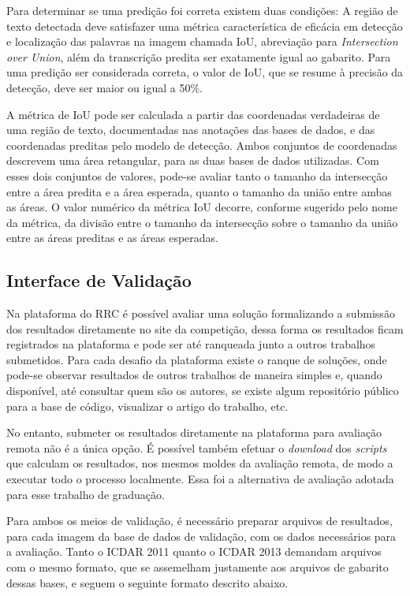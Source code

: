 Para determinar se uma predição foi correta existem duas condições: A região de texto detectada deve satisfazer uma métrica característica de 
eficácia em detecção e localização das palavras na imagem chamada IoU, abreviação para \textit{Intersection over Union}, além da transcrição 
predita ser exatamente igual ao gabarito. Para uma predição ser considerada correta, o valor de IoU, que se resume à precisão da detecção, deve 
ser maior ou igual a 50\%.

A métrica de IoU pode ser calculada a partir das coordenadas verdadeiras de uma região de texto, documentadas nas anotações das bases de dados, 
e das coordenadas preditas pelo modelo de detecção. Ambos conjuntos de coordenadas descrevem uma área retangular, para as duas bases de dados 
utilizadas. Com esses dois conjuntos de valores, pode-se avaliar tanto o tamanho da intersecção entre a área predita e a área esperada, quanto o 
tamanho da união entre ambas as áreas. O valor numérico da métrica IoU decorre, conforme sugerido pelo nome da métrica, da divisão entre o 
tamanho da intersecção sobre o tamanho da união entre as áreas preditas e as áreas esperadas.

\subsection{Interface de Validação}\label{sec:methodology_validation_interface}
Na plataforma do RRC é possível avaliar uma solução formalizando a submissão dos resultados diretamente no site da competição, dessa forma os 
resultados ficam registrados na plataforma e pode ser até ranqueada junto a outros trabalhos submetidos. Para cada desafio da plataforma existe 
o ranque de soluções, onde pode-se observar resultados de outros trabalhos de maneira simples e, quando disponível, até consultar quem são os 
autores, se existe algum repositório público para a base de código, visualizar o artigo do trabalho, etc.

No entanto, submeter os resultados diretamente na plataforma para avaliação remota não é a única opção. É possível também efetuar o \textit{download} 
dos \textit{scripts} que calculam os resultados, nos mesmos moldes da avaliação remota, de modo a executar todo o processo localmente. Essa 
foi a alternativa de avaliação adotada para esse trabalho de graduação.

Para ambos os meios de validação, é necessário preparar arquivos de resultados, para cada imagem da base de dados de validação, com os dados 
necessários para a avaliação. Tanto o ICDAR 2011 quanto o ICDAR 2013 demandam arquivos com o mesmo formato, que se assemelham justamente aos 
arquivos de gabarito dessas bases, e seguem o seguinte formato descrito abaixo.

